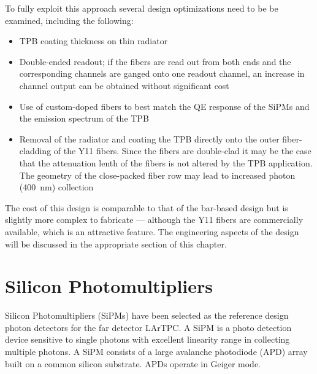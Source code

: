 To fully exploit this approach several design optimizations need to be
be examined, including the following:

\begin{itemize}

\item{TPB coating thickness on thin radiator}

\item{Double-ended readout; if the fibers are read out from both
  ends and the corresponding channels are ganged onto one readout
  channel, an increase in channel output can be obtained without
  significant cost}

\item{Use of custom-doped fibers to best match the QE response of the
  SiPMs and the emission spectrum of the TPB}

\item{Removal of the radiator and coating the TPB directly onto the outer
  fiber-cladding of the Y11 fibers. Since the fibers are double-clad
  it may be the case that the attenuation lenth of the fibers is not
  altered by the TPB application. The geometry of the close-packed
  fiber row may lead to increased photon (400~nm) collection}

\end{itemize}

The cost of this design is comparable to that of the bar-based design
but is slightly more complex to fabricate --- although the Y11 fibers
are commercially available, which is an attractive feature. The
engineering aspects of the design will be discussed in the appropriate
section of this chapter. 

\section{Silicon Photomultipliers}

Silicon Photomultipliers (SiPMs) have been selected as the reference design  photon
detectors for the far detector LArTPC.%
 A SiPM is
a photo detection device sensitive to single photons with excellent
linearity range  in collecting multiple photons.  A SiPM consists of a
large avalanche photodiode (APD) array built on a common silicon
substrate. APDs operate in Geiger mode.  

